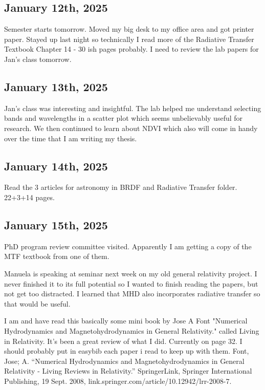 \documentclass{article}
\begin{document}
\subsection{January 12th, 2025}
Semester starts tomorrow. Moved my big desk to my office area and got printer paper. 
Stayed up last night so technically I read more of the Radiative Transfer Textbook Chapter 14 - 30 ish pages probably. I need to review the lab papers for Jan's class tomorrow. 

\subsection{January 13th, 2025}
Jan's class was interesting and insightful. The lab helped me understand selecting bands and wavelengths in a scatter plot which seems unbelievably useful for research. We then continued to learn about NDVI which also will come in handy over the time that I am writing my thesis. 

\subsection{January 14th, 2025}
Read the 3 articles for astronomy in BRDF and Radiative Transfer folder. 22+3+14 pages.


\subsection{January 15th, 2025}
PhD program review committee visited. Apparently I am getting a copy of the MTF textbook from one of them. 

Manuela is speaking at seminar next week on my old general relativity project. I never finished it to its full potential so I wanted to finish reading the papers, but not get too distracted. I learned that MHD also incorporates radiative transfer so that would be useful.

I am and have read this basically some mini book by Jose A Font "Numerical Hydrodynamics and Magnetohydrodynamics in General Relativity." called Living  in Relativity. It's been a great review of what I did. Currently on page 32. I should probably put in easybib each paper i read to keep up with them. 
Font, Jose; A. “Numerical Hydrodynamics and Magnetohydrodynamics in General Relativity - Living Reviews in Relativity.” SpringerLink, Springer International Publishing, 19 Sept. 2008, link.springer.com/article/10.12942/lrr-2008-7. 
\end{document}
